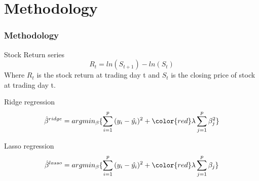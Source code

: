 \documentclass{beamer}
\begin{document}
\section{Methodology}

\begin{frame}
\frametitle{Methodology }

\begin{block}{Stock Return series}
\begin{equation}
R_t = ln( S_{t+1})-ln(S_t)
\end{equation}
Where $R_t$ is the stock return at trading day t and $S_t$ is the closing price of stock at trading day t.
\end{block}
\begin{block}{Ridge regression}
\begin{equation}
\hat{\beta}^{ridge}=argmin_{\beta}\{\sum_{i=1}^p{(y_i-\hat{y_i})^2}+{\color{red}\lambda \sum_{j=1}^p\beta_j^2}\}
\end{equation}
\end{block}

\begin{block}{Lasso regression}
\begin{equation}
\hat{\beta}^{lasso}=argmin_{\beta}\{\sum_{i=1}^p{(y_i-\hat{y_i})^2}+{\color{red}\lambda\sum_{j=1}^p \beta_j}\}
\end{equation}
\end{block}

\end{frame}
\end{document}
